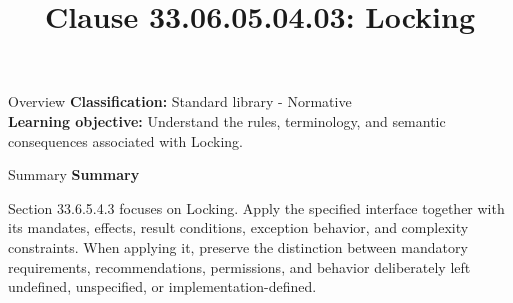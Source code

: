 \documentclass[10pt,letterpaper]{article}
\title{Clause 33.06.05.04.03: Locking}
\author{}
\date{}
\begin{document}
\maketitle
\begin{CornellOverviewBox}{Overview}
\textbf{Classification:} Standard library - Normative\\[2pt]
\textbf{Learning objective:} Understand the rules, terminology, and semantic consequences associated with Locking.
\end{CornellOverviewBox}\begin{CornellSummaryBox}{Summary}
{\sffamily\bfseries\color{Accent} Summary}\par\vspace{3pt}Section 33.6.5.4.3 focuses on Locking. Apply the specified interface together with its mandates, effects, result conditions, exception behavior, and complexity constraints. When applying it, preserve the distinction between mandatory requirements, recommendations, permissions, and behavior deliberately left undefined, unspecified, or implementation-defined.
\end{CornellSummaryBox}
\end{document}
